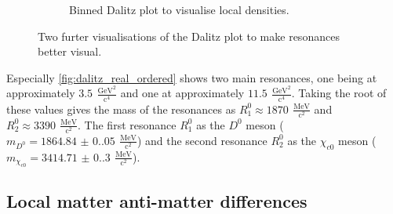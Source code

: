 \begin{figure}
\begin{subfigure}[b]{0.45\textwidth}
      \caption{Binned Dalitz plot to visualise local densities.}
      \label{fig:dalitz_real_binned}
  \end{subfigure}
     \caption{Two furter visualisations of the Dalitz plot to make resonances better visual.}
\end{figure}
Especially \autoref{fig:dalitz_real_ordered} shows two main resonances, one being at approximately $\qty{3.5}{} \, \mathrm{\frac{GeV^2}{c^4}}$ and one at approximately $\qty{11.5}{}\, \mathrm{\frac{GeV^2}{c^4}}$. Taking the root of these
values gives the mass of the resonances as $R^0_1 \approx \qty{1870}{}\, \mathrm{\frac{MeV}{c^2}}$ and $R^0_2 \approx \qty{3390}{}\, \mathrm{\frac{MeV}{c^2}}$. The first resonance $R^0_1$ as the $D^0$ meson 
($m_{D^0} = \qty{1864.84(0.05)}{}\, \mathrm{\frac{MeV}{c^2}}$\cite{PDG}) and the second resonance $R^0_2$ as the $\chi_{c0}$ meson ($m_{\chi_{c0}} = \qty{3414.71(0.30)}{}\, \mathrm{\frac{MeV}{c^2}}$\cite{PDG}).

\subsection{Local matter anti-matter differences}

